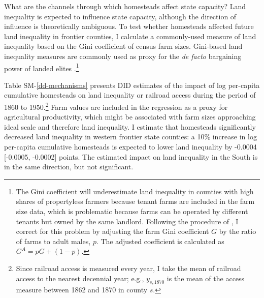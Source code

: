 \documentclass[12pt]{article}
\begin{document}
{What are the channels through which homesteads affect state capacity? Land inequality is expected to influence state capacity, although the direction of influence is theoretically ambiguous. To test whether homesteads affected future land inequality in frontier counties, I calculate a commonly-used measure of land inequality based on the Gini coefficient of census farm sizes. Gini-based land inequality measures are commonly used as proxy for the \emph{de facto} bargaining power of landed elites \citep[e.g.,][]{boix2003democracy,ziblatt2008does,ansell2015}.\footnote{The Gini coefficient will underestimate land inequality in counties with high shares of propertyless farmers because tenant farms are included in the farm size data, which is problematic because farms can be operated by different tenants but owned by the same landlord. Following the procedure of \citet{vollrath2013inequality}, I correct for this problem by adjusting the farm Gini coefficient $G$ by the ratio of farms to adult males, $p$. The adjusted coefficient is calculated as $G^A = p G + (1-p)$.}%

Table SM-\ref{dd-mechanisms} presents DID estimates of the impact of log per-capita cumulative homesteads on land inequality or railroad access during the period of 1860 to 1950.\footnote{Since railroad access is measured every year, I take the mean of railroad access to the nearest decennial year; e.g., $y_{s, 1870}$ is the mean of the access measure between 1862 and 1870 in county $s$.} Farm values are included in the regression as a proxy for agricultural productivity, which might be associated with farm sizes approaching ideal scale and therefore land inequality. I estimate that homesteads significantly decreased land inequality in western frontier state counties: a 10\% increase in log per-capita cumulative homesteads is expected to lower land inequality by -0.0004 [-0.0005, -0.0002] points. The estimated impact on land inequality in the South is in the same direction, but not significant. 

}
\end{document}
